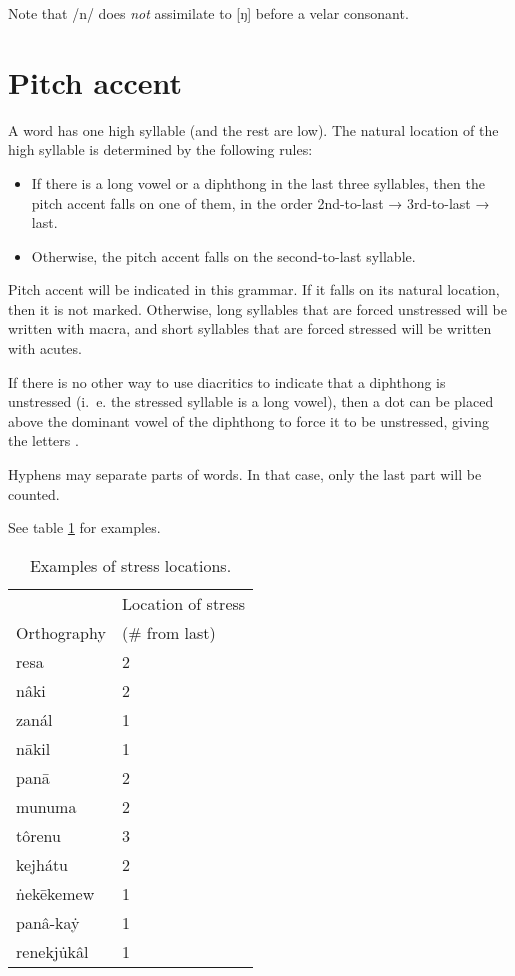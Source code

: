 \documentclass{book}
\begin{document}
Note that /n/ does \emph{not} assimilate to [ŋ] before a velar consonant.

\section{Pitch accent}

A word has one high syllable (and the rest are low). The natural location of the high syllable is determined by the following rules:

\begin{itemize}
    \item If there is a long vowel or a diphthong in the last three syllables, then the pitch accent falls on one of them, in the order 2nd-to-last → 3rd-to-last → last.
    \item Otherwise, the pitch accent falls on the second-to-last syllable.
\end{itemize}

Pitch accent will be indicated in this grammar. If it falls on its natural location, then it is not marked. Otherwise, long syllables that are forced unstressed will be written with macra, and short syllables that are forced stressed will be written with acutes.

If there is no other way to use diacritics to indicate that a diphthong is unstressed (i.~e. the stressed syllable is a long vowel), then a dot can be placed above the dominant vowel of the diphthong to force it to be unstressed, giving the letters .

Hyphens may separate parts of words. In that case, only the last part will be counted.

See table \ref{table:stress} for examples.

\begin{table}[ht]
    \caption{Examples of stress locations. \label{table:stress}}
    \centering
    \begin{tabular}{ll}
        & Location of stress \\
        Orthography & (\# from last) \\
        \hline
        resa & 2 \\
        nâki & 2 \\
        zanál & 1 \\
        nākil & 1 \\
        panā & 2 \\
        munuma & 2 \\
        tôrenu & 3 \\
        kejhátu & 2 \\
        ṅekēkemew & 1 \\
        panâ-kaẏ & 1 \\
        renekju̇kâl & 1 \\
    \end{tabular}
\end{table}
\end{document}
